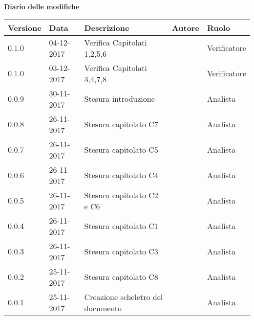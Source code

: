 \documentclass[StudioDiFattibilità.tex]{subfiles}
\begin{document}
\huge \bfseries Diario delle modifiche\\
\begin{table}[htbp]
	\centering
	\renewcom
	\begin{tabularx}{\textwidth}{p{1.6cm}|p{2cm}|p{4cm}|p{3cm}|p{2cm}}
		\hline
		\textbf{Versione} & \textbf{Data} & \textbf{Descrizione} & \textbf{Autore} & \textbf{Ruolo}\\
		\hline
		0.1.0 & 04-12-2017 & Verifica Capitolati 1,2,5,6 & \Gianluca & Verificatore \\
		
		\hline
		0.1.0 & 03-12-2017 & Verifica Capitolati 3,4,7,8 & \Davide & Verificatore \\
	
		\hline
		0.0.9 & 30-11-2017 & Stesura introduzione & \Elena & Analista\\

		\hline
		0.0.8 & 26-11-2017 & Stesura capitolato C7 & \Gianluca & Analista\\

		\hline
		0.0.7 & 26-11-2017 & Stesura capitolato C5 & \Parwinder & Analista\\
		
		\hline
		0.0.6 & 26-11-2017 & Stesura capitolato C4 & \Valentina & Analista\\
		
		\hline
		0.0.5 & 26-11-2017 & Stesura capitolato C2 e C6 & \Mirco & Analista \\

		\hline
		0.0.4 & 26-11-2017 & Stesura capitolato C1 & \Riccardo & Analista \\
		
		\hline
		0.0.3 & 26-11-2017 & Stesura capitolato C3 & \Davide & Analista \\
		
		\hline
		0.0.2 & 25-11-2017 & Stesura capitolato C8 & \Elena & Analista \\
		
		\hline
		0.0.1 & 25-11-2017 & Creazione scheletro del documento & \Valentina & Analista \\
		\hline
	
	\end{tabularx}

\end{table}
\restoregeometry
\end{document}
